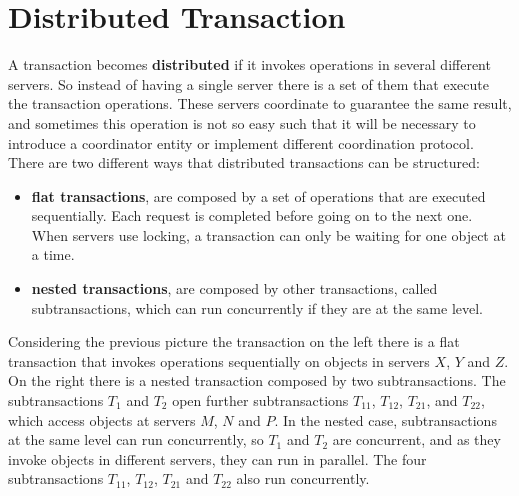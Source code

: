 \section{Distributed Transaction}
A transaction becomes \textbf{distributed} if it invokes operations in several different
servers. So instead of having a single server there is a set of them that execute the transaction operations. These servers coordinate to guarantee the same result, and sometimes this operation is not so easy such that it will be necessary to introduce a coordinator entity or implement different coordination protocol. There are two different ways that distributed transactions can be structured:
\begin{itemize}
	\item \textbf{flat transactions}, are composed by a set of operations that are executed sequentially. Each request is completed before going on to the next one. When servers use locking, a transaction can only be waiting for one object at a time.
	
	\item \textbf{nested transactions}, are composed by other transactions, called subtransactions, which can run concurrently if they are at the same level.
	
\end{itemize}
Considering the previous picture the transaction on the left there is a flat transaction that invokes operations sequentially on objects in servers $X$, $Y$ and $Z$. 
On the right there is a nested transaction composed by two subtransactions. The subtransactions $T_1$ and $T_2$ open further subtransactions $T_{11}$, $T_{12}$, $T_{21}$, and $T_{22}$, which access objects at servers $M$, $N$ and $P$. In the nested case, subtransactions at the same level can run concurrently, so $T_1$ and $T_2$ are concurrent, and as they invoke objects in different servers, they can run in parallel. The four subtransactions  $T_{11}$,  $T_{12}$, $T_{21}$ and $T_{22}$ also run concurrently.



